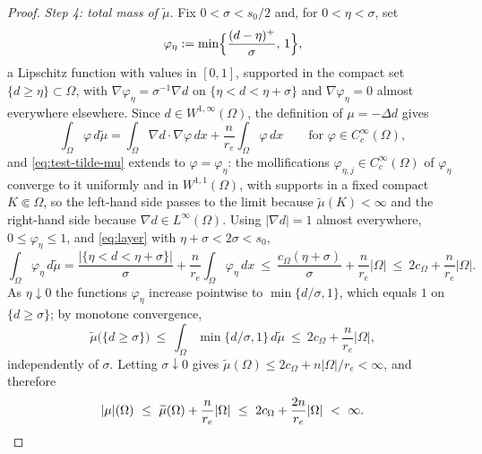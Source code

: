 \documentclass[10pt,a4paper]{amsart}
\newcommand{\abs}[1]{\lvert #1\rvert}
\begin{document}
\begin{proof}
\emph{Step 4: total mass of $\widetilde\mu$.}
Fix $0<\sigma<s_0/2$ and, for $0<\eta<\sigma$, set
\[
\varphi_{\eta}:=\min\Bigl\{\frac{(d-\eta)^+}{\sigma},\,1\Bigr\},
\]
a Lipschitz function with values in $[0,1]$, supported in the compact set
$\{d\ge\eta\}\subset\Omega$, with $\nabla\varphi_\eta=\sigma^{-1}\nabla d$
on $\{\eta<d<\eta+\sigma\}$ and $\nabla\varphi_\eta=0$ almost everywhere
elsewhere. Since $d\in W^{1,\infty}(\Omega)$, the definition of $\mu=-\Delta d$
gives
\begin{equation}\label{eq:test-tilde-mu}
\int_\Omega\varphi\,d\widetilde\mu
=\int_\Omega\nabla d\cdot\nabla\varphi\,dx+\frac n{r_e}\int_\Omega\varphi\,dx
\qquad\text{for }\varphi\in C_c^\infty(\Omega),
\end{equation}
and \eqref{eq:test-tilde-mu} extends to $\varphi=\varphi_\eta$: the
mollifications $\varphi_{\eta,j}\in C_c^\infty(\Omega)$ of $\varphi_\eta$
converge to it uniformly and in $W^{1,1}(\Omega)$, with supports in a fixed
compact $K\Subset\Omega$, so the left-hand side passes to the limit because
$\widetilde\mu(K)<\infty$ and the right-hand side because
$\nabla d\in L^\infty(\Omega)$. Using $\abs{\nabla d}=1$ almost everywhere,
$0\le\varphi_\eta\le1$, and \eqref{eq:layer} with $\eta+\sigma<2\sigma<s_0$,
\[
\int_\Omega\varphi_{\eta}\,d\widetilde\mu
=\frac{\abs{\{\eta<d<\eta+\sigma\}}}{\sigma}+\frac n{r_e}\int_\Omega\varphi_\eta\,dx
\ \le\ \frac{c_\Omega(\eta+\sigma)}{\sigma}+\frac n{r_e}\abs{\Omega}
\ \le\ 2c_\Omega+\frac n{r_e}\abs{\Omega}.
\]
As $\eta\downarrow0$ the functions $\varphi_\eta$ increase pointwise to
$\min\{d/\sigma,1\}$, which equals $1$ on $\{d\ge\sigma\}$; by monotone
convergence,
\[
\widetilde\mu\bigl(\{d\ge\sigma\}\bigr)
\ \le\ \int_\Omega\min\{d/\sigma,1\}\,d\widetilde\mu
\ \le\ 2c_\Omega+\frac n{r_e}\abs{\Omega},
\]
independently of $\sigma$. Letting $\sigma\downarrow0$ gives
$\widetilde\mu(\Omega)\le2c_\Omega+n\abs{\Omega}/r_e<\infty$, and therefore
\[
\abs{\mu}(\Omega)\ \le\ \widetilde\mu(\Omega)+\frac n{r_e}\abs{\Omega}
\ \le\ 2c_\Omega+\frac{2n}{r_e}\abs{\Omega}\ <\ \infty . \qedhere
\]
\end{proof}
\end{document}
